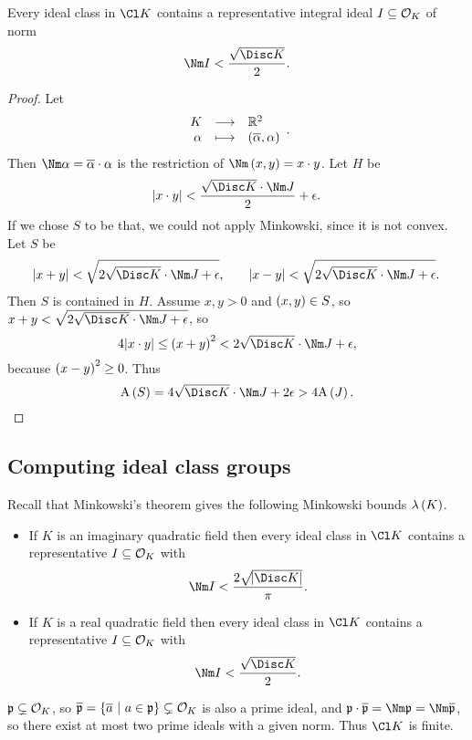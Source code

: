\begin{theorem}
Every ideal class in $ \Cl K $ contains a representative integral ideal $ I \subseteq \mathcal{O}_K $ of norm
$$ \Nm I < \dfrac{\sqrt{\Disc K}}{2}. $$
\end{theorem}

\begin{proof}
Let
$$ \function{K}{\RR^2}{\alpha}{\br{\overline{\alpha}, \alpha}}. $$
Then $ \Nm \alpha = \overline{\alpha} \cdot \alpha $ is the restriction of $ \Nm \br{x, y} = x \cdot y $. Let $ H $ be
$$ \abs{x \cdot y} < \dfrac{\sqrt{\Disc K} \cdot \Nm J}{2} + \epsilon. $$
If we chose $ S $ to be that, we could not apply Minkowski, since it is not convex. Let $ S $ be
$$ \abs{x + y} < \sqrt{2\sqrt{\Disc K} \cdot \Nm J + \epsilon}, \qquad \abs{x - y} < \sqrt{2\sqrt{\Disc K} \cdot \Nm J + \epsilon}. $$
Then $ S $ is contained in $ H $. Assume $ x, y > 0 $ and $ \br{x, y} \in S $, so $ x + y < \sqrt{2\sqrt{\Disc K} \cdot \Nm J + \epsilon} $, so
$$ 4\abs{x \cdot y} \le \br{x + y}^2 < 2\sqrt{\Disc K} \cdot \Nm J + \epsilon, $$
because $ \br{x - y}^2 \ge 0 $. Thus
$$ \A\br{S} = 4\sqrt{\Disc K} \cdot \Nm J + 2\epsilon > 4\A\br{J}. $$
\end{proof}

\pagebreak

\subsection{Computing ideal class groups}


Recall that Minkowski's theorem gives the following Minkowski bounds $ \lambda\br{K} $.
\begin{itemize}
\item If $ K $ is an imaginary quadratic field then every ideal class in $ \Cl K $ contains a representative $ I \subseteq \mathcal{O}_K $ with
$$ \Nm I < \dfrac{2\sqrt{\abs{\Disc K}}}{\pi}. $$
\item If $ K $ is a real quadratic field then every ideal class in $ \Cl K $ contains a representative $ I \subseteq \mathcal{O}_K $ with
$$ \Nm I < \dfrac{\sqrt{\Disc K}}{2}. $$
\end{itemize}

\begin{note*}
$ \mathfrak{p} \subsetneq \mathcal{O}_K $, so $ \overline{\ppp} = \cbr{\overline{a} \st a \in \ppp} \subsetneq \OOO_K $ is also a prime ideal, and $ \ppp \cdot \overline{\ppp} = \Nm \ppp = \Nm \overline{\ppp} $, so there exist at most two prime ideals with a given norm. Thus $ \Cl K $ is finite.
\end{note*}


